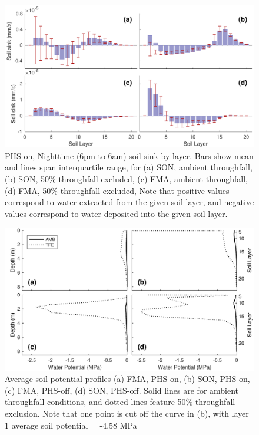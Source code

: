 \documentclass[draft,linenumbers]{agujournal}
\begin{document}
    \clearpage
    \begin{figure}[h]
     \centering
     \includegraphics[width=30pc]{../figs/fig10.pdf}
     \caption{PHS-on, Nighttime (6pm to 6am)  soil sink by layer.
          Bars show mean and lines span interquartile range, for 
     (a) SON, ambient throughfall,
     (b) SON, 50\% throughfall excluded,
     (c) FMA, ambient throughfall,
     (d) FMA, 50\% throughfall excluded,
     Note that positive values correspond to water extracted from the given soil layer, 
     and negative values correspond to water deposited into the given soil layer.}
     \label{fig10}
  \end{figure}
  
      \clearpage
    \begin{figure}[h]
     \centering
     \includegraphics[width=30pc]{../figs/fig13.pdf}
     \caption{Average soil potential profiles
     (a) FMA, PHS-on,
     (b) SON, PHS-on,
     (c) FMA, PHS-off,
     (d) SON, PHS-off.
     Solid lines are for ambient throughfall conditions, and dotted lines feature 50\% throughfall exclusion.
     Note that one point is cut off the curve in (b), with layer 1 average soil potential = -4.58 MPa }
     \label{fig11}
  \end{figure}
  
\end{document}
